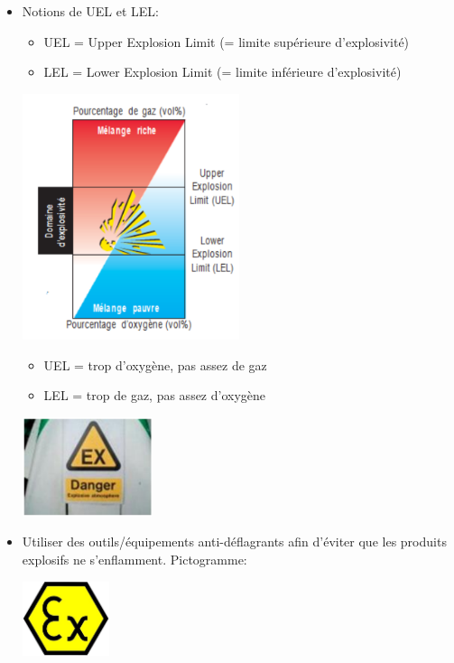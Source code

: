 \documentclass[a4paper]{article}
\begin{document}
\begin{itemize}
\item Notions de UEL et LEL:
\begin{itemize}
    \item UEL = Upper Explosion Limit (= limite supérieure d'explosivité)
    \item LEL = Lower Explosion Limit (= limite inférieure d'explosivité)
\end{itemize}
\begin{center}
\includegraphics[width=0.5\textwidth]{images/uel-lel.PNG}
\end{center}
\begin{itemize}
    \item UEL = trop d'oxygène, pas assez de gaz
    \item LEL = trop de gaz, pas assez d'oxygène
\end{itemize}
\begin{center}
\includegraphics[width=0.3\textwidth]{images/risque-explosion.PNG}
\end{center}





\item Utiliser des outils/équipements anti-déflagrants afin d'éviter que les produits explosifs ne s'enflamment. Pictogramme:
\begin{center}
\includegraphics[width=0.2\textwidth]{images/antideflagrant.jpg}
\end{center}






\end{itemize}
\end{document}

